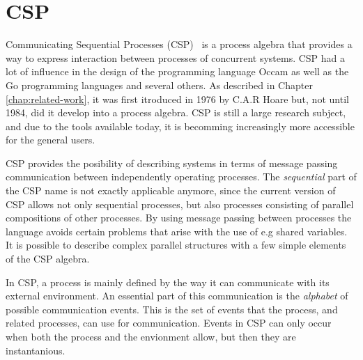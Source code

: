 \section{CSP}
\label{sec:csp_background}
Communicating Sequential Processes (CSP)~\cite{Hoare1978} is a process algebra that provides a way to express interaction between processes of concurrent systems.
CSP had a lot of influence in the design of the programming language Occam as well as the Go programming languages and several others. As described in Chapter \ref{chap:related-work}, it was first itroduced in 1976 by C.A.R Hoare but, not until 1984, did it develop into a process algebra. CSP is still a large research subject, and due to the tools available today, it is becomming increasingly more accessible for the general users.

CSP provides the posibility of describing systems in terms of message passing communication between independently operating processes. The \textit{sequential} part of the CSP name is not exactly applicable anymore, since the current version of CSP allows not only sequential processes, but also processes consisting of parallel compositions of other processes.
By using message passing between processes the language avoids certain problems that arise with the use of e.g shared variables.
It is possible to describe complex parallel structures with a few simple elements of the CSP algebra.

In CSP, a process is mainly defined by the way it can communicate with its external environment. An essential part of this communication is the \textit{alphabet} of possible communication events. This is the set of events that the process, and related processes, can use for communication. Events in CSP can only occur when both the process and the envionment allow, but then they are instantanious.

